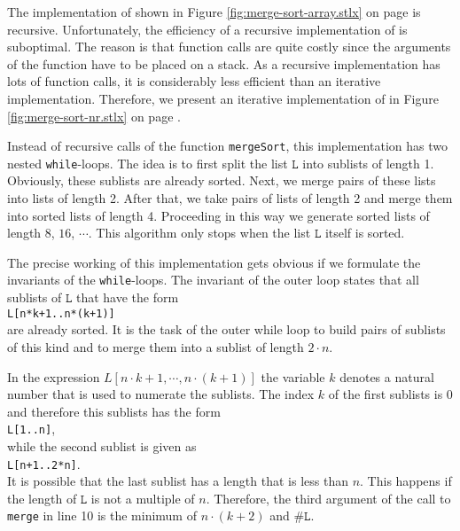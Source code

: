 \noindent
The implementation of  shown in Figure \ref{fig:merge-sort-array.stlx} on page
\pageref{fig:merge-sort-array.stlx} is recursive.  Unfortunately, the efficiency of a recursive
implementation of  is suboptimal.  The reason is that function calls are quite
costly since the arguments of the function have to be placed on a stack.  As a recursive
implementation has lots of function calls, it is considerably less efficient than an iterative
implementation.  Therefore, we present an iterative implementation of  in Figure
\ref{fig:merge-sort-nr.stlx} on page \pageref{fig:merge-sort-nr.stlx}.

Instead of recursive calls of the function \texttt{mergeSort}, this implementation has two nested 
\texttt{while}-loops.  The idea is to first split the list $\texttt{L}$ into sublists of length 1.
Obviously, these sublists are already sorted.  Next, we merge pairs of these lists into lists of
length 2.  After that, we take pairs of lists of length 2 and merge them into sorted lists of length
4. Proceeding in this way we generate sorted lists of length
$8$, $16$, $\cdots$.  This algorithm only stops when the list $\texttt{L}$ itself is sorted.

The precise working of this implementation gets obvious if we formulate the invariants of the
\texttt{while}-loops.  The invariant of the outer loop states that all sublists of $\texttt{L}$ 
that have the form
\\[0.2cm]
\hspace*{1.3cm}
\texttt{L[n*k+1..n*(k+1)]}
\\[0.2cm]
are already sorted.  It is the task of the outer while loop to build pairs of sublists of this kind
and to merge them into a sublist of length $2 \cdot n$.

In the expression $L[n \cdot k + 1, \cdots, n \cdot (k+1)]$ the variable $k$ denotes a natural
number that is used to numerate the sublists.  The index $k$ of the first sublists is $0$ and
therefore this sublists has the form
\\[0.2cm]
\hspace*{1.3cm}
\texttt{L[1..n]},
\\[0.2cm]
while the second sublist is given as
\\[0.2cm]
\hspace*{1.3cm}
\texttt{L[n+1..2*n]}.
\\[0.2cm]
It is possible that the last sublist has a length that is less than $n$.  This happens if the length
of $\texttt{L}$ is not a multiple of $n$.  Therefore, the third argument of the call to \texttt{merge}
in line 10 is the minimum of $n\cdot(k+2)$ and $\texttt{\#L}$.

